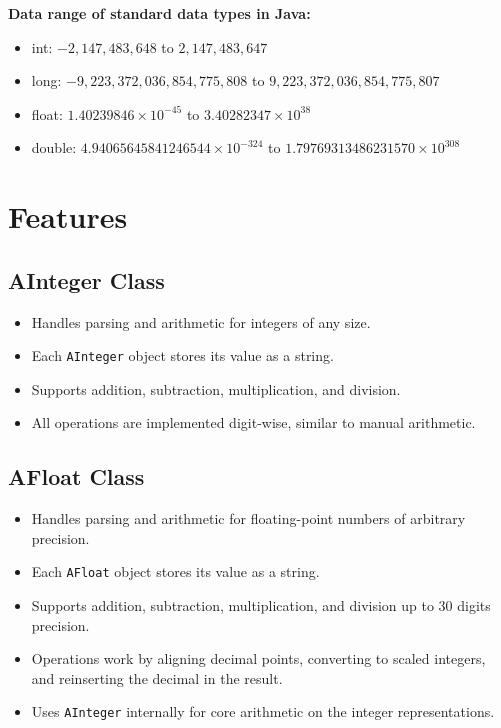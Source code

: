 \documentclass[12pt]{article}
\begin{document}
\textbf{Data range of standard data types in Java:}
\begin{itemize}
    \item int: $-2,147,483,648$ to $2,147,483,647$
    \item long: $-9,223,372,036,854,775,808$ to $9,223,372,036,854,775,807$
    \item float: $1.40239846 \times 10^{-45}$ to $3.40282347 \times 10^{38}$
    \item double: $4.94065645841246544 \times 10^{-324}$ to $1.79769313486231570 \times 10^{308}$
\end{itemize}

\section{Features}

\subsection{AInteger Class}
\begin{itemize}
    \item Handles parsing and arithmetic for integers of any size.
    \item Each \texttt{AInteger} object stores its value as a string.
    \item Supports addition, subtraction, multiplication, and division.
    \item All operations are implemented digit-wise, similar to manual arithmetic.
\end{itemize}

\subsection{AFloat Class}
\begin{itemize}
    \item Handles parsing and arithmetic for floating-point numbers of arbitrary precision.
    \item Each \texttt{AFloat} object stores its value as a string.
    \item Supports addition, subtraction, multiplication, and division up to 30 digits precision.
    \item Operations work by aligning decimal points, converting to scaled integers, and reinserting the decimal in the result.
    \item Uses \texttt{AInteger} internally for core arithmetic on the integer representations.
\end{itemize}
\end{document}
